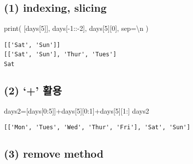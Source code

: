 \documentclass[
  letterpaper,
  DIV=11,
  numbers=noendperiod]{scrreprt}
\newenvironment{Shaded}{\begin{snugshade}}{\end{snugshade}}
\newcommand{\BuiltInTok}[1]{\textcolor[rgb]{0.00,0.23,0.31}{#1}}
\newcommand{\CharTok}[1]{\textcolor[rgb]{0.13,0.47,0.30}{#1}}
\newcommand{\DecValTok}[1]{\textcolor[rgb]{0.68,0.00,0.00}{#1}}
\newcommand{\NormalTok}[1]{\textcolor[rgb]{0.00,0.23,0.31}{#1}}
\newcommand{\OperatorTok}[1]{\textcolor[rgb]{0.37,0.37,0.37}{#1}}
\newcommand{\StringTok}[1]{\textcolor[rgb]{0.13,0.47,0.30}{#1}}
\begin{document}
\subsection*{(1) indexing, slicing}\label{indexing-slicing}

\begin{Shaded}
\begin{Highlighting}[]
\BuiltInTok{print}\NormalTok{(}
\NormalTok{    [days[}\DecValTok{5}\NormalTok{]],}
\NormalTok{    days[}\OperatorTok{{-}}\DecValTok{1}\NormalTok{::}\OperatorTok{{-}}\DecValTok{2}\NormalTok{],}
\NormalTok{    days[}\DecValTok{5}\NormalTok{][}\DecValTok{0}\NormalTok{],}
\NormalTok{    sep}\OperatorTok{=}\StringTok{\textquotesingle{}}\CharTok{\textbackslash{}n}\StringTok{\textquotesingle{}}
\NormalTok{)}
\end{Highlighting}
\end{Shaded}

\begin{verbatim}
[['Sat', 'Sun']]
[['Sat', 'Sun'], 'Thur', 'Tues']
Sat
\end{verbatim}

\subsection*{(2) `+' 활용}\label{uxd65cuxc6a9}

\begin{Shaded}
\begin{Highlighting}[]
\NormalTok{days2}\OperatorTok{=}\NormalTok{[days[}\DecValTok{0}\NormalTok{:}\DecValTok{5}\NormalTok{]]}\OperatorTok{+}\NormalTok{days[}\DecValTok{5}\NormalTok{][}\DecValTok{0}\NormalTok{:}\DecValTok{1}\NormalTok{]}\OperatorTok{+}\NormalTok{days[}\DecValTok{5}\NormalTok{][}\DecValTok{1}\NormalTok{:]}
\NormalTok{days2}
\end{Highlighting}
\end{Shaded}

\begin{verbatim}
[['Mon', 'Tues', 'Wed', 'Thur', 'Fri'], 'Sat', 'Sun']
\end{verbatim}

\subsection*{(3) remove method}\label{remove-method}
\end{document}

